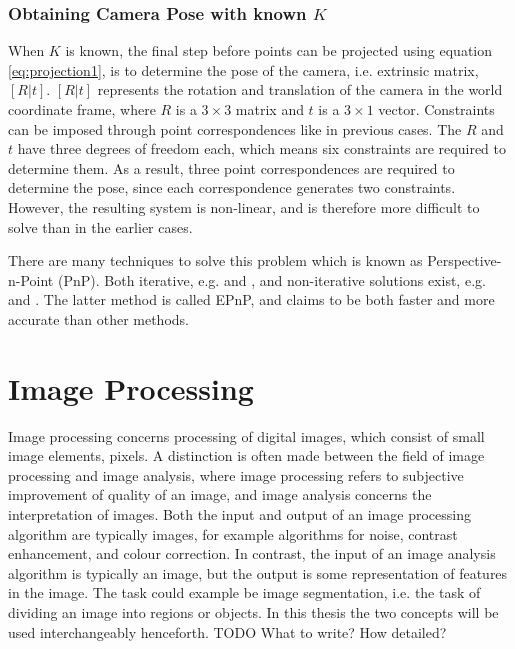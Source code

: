 \subsubsection{Obtaining Camera Pose with known $K$} \label{camera-pose}
When $K$ is known, the final step before points can be projected using equation \ref{eq:projection1}, is to determine the pose of the camera, i.e. extrinsic matrix, $[R|t]$. $[R|t]$ represents the rotation and translation of the camera in the world coordinate frame, where $R$ is a $3 \times 3$ matrix and $t$ is a $3 \times 1$ vector.
Constraints can be imposed through point correspondences like in previous cases.
The $R$ and $t$ have three degrees of freedom each, which means six constraints are required to determine them.
As a result, three point correspondences are required to determine the pose, since each correspondence generates two constraints.
However, the resulting system is non-linear, and is therefore more difficult to solve than in the earlier cases. \cite[187]{hartley-zisserman}

There are many techniques to solve this problem which is known as Perspective-n-Point (PnP). %
Both iterative, e.g. \cite{hesch-pnp} and \cite{oberkampf-pnp}, and non-iterative solutions exist, e.g. \cite{quan-pnp} and \cite{lepetit-pnp}.
The latter method is called EPnP, and claims to be both faster and more accurate than other methods. 

\section{Image Processing}
Image processing concerns processing of digital images, which consist of small image elements, pixels.
A distinction is often made between the field of image processing and image analysis, where image processing refers to subjective improvement of quality of an image, and image analysis concerns the interpretation of images.
Both the input and output of an image processing algorithm are typically images, for example algorithms for noise, contrast enhancement, and colour correction. 
In contrast, the input of an image analysis algorithm is typically an image, but the output is some representation of features in the image.
The task could example be image segmentation, i.e. the task of dividing an image into regions or objects.\cite[p. 1-2]{pitas}\cite[p. 1-2]{gonzalez-woods}
In this thesis the two concepts will be used interchangeably henceforth.
TODO What to write? How detailed?%
















